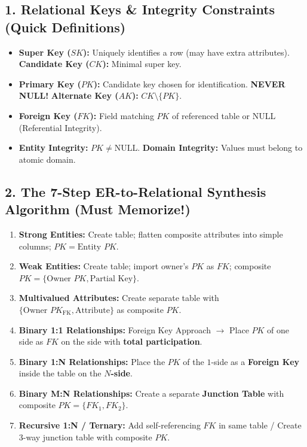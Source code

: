 \documentclass[10pt,a4paper]{article}
\begin{document}
\subsection{1. Relational Keys \& Integrity Constraints (Quick Definitions)}
\begin{itemize}
  \item \textbf{Super Key ($SK$):} Uniquely identifies a row (may have extra attributes). \textbf{Candidate Key ($CK$):} Minimal super key.
  \item \textbf{Primary Key ($PK$):} Candidate key chosen for identification. \textbf{NEVER NULL!} \textbf{Alternate Key ($AK$):} $CK \setminus \{PK\}$.
  \item \textbf{Foreign Key ($FK$):} Field matching $PK$ of referenced table or NULL (Referential Integrity).
  \item \textbf{Entity Integrity:} $PK \neq \text{NULL}$. \textbf{Domain Integrity:} Values must belong to atomic domain.
\end{itemize}

\subsection{2. The 7-Step ER-to-Relational Synthesis Algorithm (Must Memorize!)}
\begin{enumerate}
  \item \textbf{Strong Entities:} Create table; flatten composite attributes into simple columns; $PK = \text{Entity } PK$.
  \item \textbf{Weak Entities:} Create table; import owner's $PK$ as $FK$; composite $PK = \{ \text{Owner } PK, \text{Partial Key} \}$.
  \item \textbf{Multivalued Attributes:} Create separate table with $\{ \text{Owner } PK_{\text{FK}}, \text{Attribute} \}$ as composite $PK$.
  \item \textbf{Binary 1:1 Relationships:} Foreign Key Approach $\to$ Place $PK$ of one side as $FK$ on the side with \textbf{total participation}.
  \item \textbf{Binary 1:N Relationships:} Place the $PK$ of the $1$-side as a \textbf{Foreign Key} inside the table on the \textbf{$N$-side}.
  \item \textbf{Binary M:N Relationships:} Create a separate \textbf{Junction Table} with composite $PK = \{ FK_1, FK_2 \}$.
  \item \textbf{Recursive 1:N / Ternary:} Add self-referencing $FK$ in same table / Create 3-way junction table with composite $PK$.
\end{enumerate}
\end{document}
